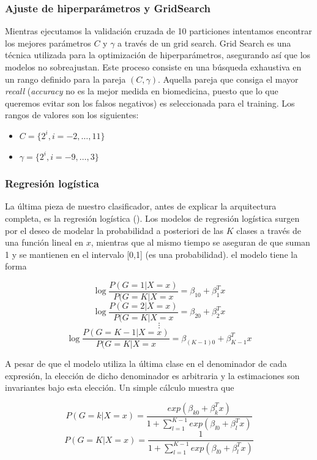 \subsubsection{Ajuste de hiperparámetros y GridSearch}

Mientras ejecutamos la validación cruzada de 10 particiones intentamos encontrar los mejores parámetros $C$ y $\gamma$ a través de un grid search. Grid Search es una técnica utilizada para la optimización de hiperparámetros, asegurando así que los modelos no sobreajustan. Este proceso consiste en una búsqueda exhaustiva en un rango definido para la pareja $(C,\gamma)$. Aquella pareja que consiga el mayor \textit{recall} (\textit{accuracy} no es la mejor medida en biomedicina, puesto que lo que queremos evitar son los falsos negativos) es seleccionada para el training. Los rangos de valores son los siguientes:
\begin{itemize}
	\item $C = \{2^{i},i=-2,\dots,11\} $
	\item $\gamma = \{2^{i}, i =-9,\dots,3\}$
\end{itemize}

\subsubsection{Regresión logística}

La última pieza de nuestro clasificador, antes de explicar la arquitectura completa, es la regresión logística (\cite{esl}). Los modelos de regresión logística surgen por el deseo de modelar la probabilidad a posteriori de las $K$ clases a través de una función lineal en $x$, mientras que al mismo tiempo se aseguran de que suman 1 y se mantienen en el intervalo [0,1] (es una probabilidad). el modelo tiene la forma

$$\log \frac{P(G=1| X =x)}{P(G=K|X=x} =  \beta_{10} + \beta_1^Tx$$
 $$\log \frac{P(G=2| X =x)}{P(G=K|X=x} =  \beta_{20} + \beta_2^Tx$$
 $$\vdots$$
 $$\log \frac{P(G=K-1| X =x)}{P(G=K|X=x} =  \beta_{(K-1)0} + \beta_{K-1}^Tx$$
 
 A pesar de que el modelo utiliza la última clase en el denominador de cada expresión, la elección de dicho denominador es arbitraria y la estimaciones son invariantes bajo esta elección. Un simple cálculo muestra que
 
 $$P(G=k| X=x) = \frac{exp(\beta_{k0}+\beta_k^T x)}{1+\sum_{l=1}^{K-1}exp(\beta_{l0}+\beta_l^Tx)}$$
  $$P(G=K| X=x) = \frac{1}{1+\sum_{l=1}^{K-1}exp(\beta_{l0}+\beta_l^Tx)}$$
  
